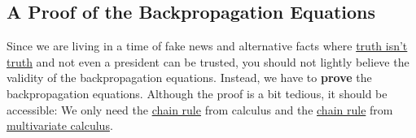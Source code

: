 \subsection{A Proof of the Backpropagation Equations}
Since we are living in a time of fake news and alternative facts where
\href{https://www.theguardian.com/us-news/2018/aug/19/truth-isnt-truth-rudy-giuliani-trump-alternative-facts-orwellian}{truth isn't truth} 
and not even a president can be trusted,  you should not lightly believe the validity of the backpropagation equations.  Instead, 
we have to \textbf{prove} the backpropagation equations.  Although the proof is a bit tedious, it should be
accessible: We only need the \href{https://en.wikipedia.org/wiki/Chain_rule}{chain rule} from calculus and the 
\href{https://en.wikipedia.org/wiki/Chain_rule}{chain rule} from \href{https://en.wikipedia.org/wiki/Multivariable_calculus}{multivariate calculus}.

